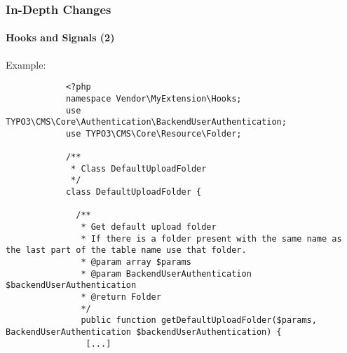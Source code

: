 \begin{frame}[fragile]
	\frametitle{In-Depth Changes}
	\framesubtitle{Hooks and Signals (2)}

	\lstset{basicstyle=\tiny\ttfamily}

	\small Example:\normalsize

		\begin{lstlisting}
			<?php
			namespace Vendor\MyExtension\Hooks;
			use TYPO3\CMS\Core\Authentication\BackendUserAuthentication;
			use TYPO3\CMS\Core\Resource\Folder;

			/**
			 * Class DefaultUploadFolder
			 */
			class DefaultUploadFolder {

			  /**
			   * Get default upload folder
			   * If there is a folder present with the same name as the last part of the table name use that folder.
			   * @param array $params
			   * @param BackendUserAuthentication $backendUserAuthentication
			   * @return Folder
			   */
			   public function getDefaultUploadFolder($params, BackendUserAuthentication $backendUserAuthentication) {
			    [...]
		\end{lstlisting}

\end{frame}

